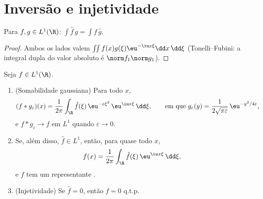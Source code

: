 \section{Inversão e injetividade}

\begin{lemma}
\label{lem:b3:fouriertransform:multiplication}
Para $f, g \in L^1(\R)$: $\displaystyle\int \hat f\,g =
\int f\,\hat g$.
\end{lemma}

\begin{proof}
Ambos os lados valem $\iint f(x)g(\xi)\eu^{-\iu x\xi}\dd
x\,\dd\xi$ (Tonelli--Fubini: a integral dupla do valor
absoluto é $\norm f_1\norm g_1$).
\end{proof}

\begin{theorem}[Inversão]\label{thm:b3:fouriertransform:inversion}
Seja $f \in L^1(\R)$.
\begin{enumerate}
  \item (Somabilidade gaussiana) Para todo $x$,
        \[
        (f * g_\varepsilon)(x) =
        \frac1{2\pi}\int_\R \hat f(\xi)\,
        \eu^{-\varepsilon\xi^2}\,\eu^{\iu x\xi}\,\dd\xi,
        \qquad\text{em que } g_\varepsilon(y) =
        \frac{1}{2\sqrt{\pi\varepsilon}}\,
        \eu^{-y^2/4\varepsilon},
        \]
        e $f * g_\varepsilon \to f$ em $L^1$ quando $\varepsilon
        \to 0$.
  \item Se, além disso, $\hat f \in L^1$, então, para quase todo $x$,
        \[
        f(x) = \frac{1}{2\pi}\int_\R \hat
        f(\xi)\,\eu^{\iu x\xi}\,\dd\xi ,
        \]
        e $f$ tem um representante .
  \item (Injetividade) Se $\hat f = 0$, então $f = 0$ q.t.p.
\end{enumerate}
\end{theorem}

